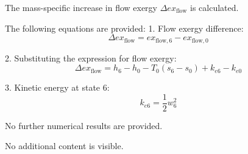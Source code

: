 The mass-specific increase in flow exergy \( \Delta ex_{\text{flow}} \) is calculated.  

The following equations are provided:  
1. Flow exergy difference:  
   \[
   \Delta ex_{\text{flow}} = ex_{\text{flow},6} - ex_{\text{flow},0}
   \]  

2. Substituting the expression for flow exergy:  
   \[
   \Delta ex_{\text{flow}} = h_6 - h_0 - T_0 (s_6 - s_0) + k_{e6} - k_{e0}
   \]  

3. Kinetic energy at state 6:  
   \[
   k_{e6} = \frac{1}{2} w_6^2
   \]  

No further numerical results are provided.  

No additional content is visible.